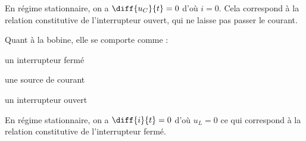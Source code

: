 \reponse{\reponseC}

\begin{corrige}
En régime stationnaire, on a $\diff{u_C}{t} = 0$ d'où $i=0$. Cela correspond à la relation constitutive de l'interrupteur ouvert, qui ne laisse pas passer le courant.
\end{corrige}




\begin{enonce}
Quant à la bobine, elle se comporte comme :
\begin{listeQCM3Colonnes}
\item un interrupteur fermé
\item une source de courant
\item un interrupteur ouvert
\end{listeQCM3Colonnes}
\bigskip
\end{enonce}

\reponse{\reponseA}

\begin{corrige}
En régime stationnaire, on a $\diff{i}{t} = 0$ d'où $u_L=0$ ce qui correspond à la relation constitutive de l'interrupteur fermé.
\end{corrige}


\finEntrainement





\hauteurLargeurCadreReponse		{6mm}{2cm}
\initialisationEntrainement

